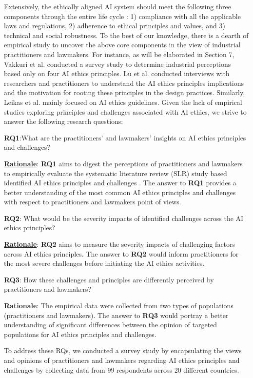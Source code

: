 Extensively, the ethically aligned AI system should meet the following three components through the entire life cycle \cite{AR2}: 1) compliance with all the applicable laws and regulations, 2) adherence to ethical principles and values, and 3) technical and social robustness.
To the best of our knowledge, there is a dearth of empirical study to uncover the above core components in the view of industrial practitioners and lawmakers. For instance, as will be elaborated in Section 7, Vakkuri et al. \cite{AR4} conducted a survey study to determine industrial perceptions based only on four AI ethics principles. Lu et al.\cite{AR12} conducted interviews with researchers and practitioners to understand the AI ethics principles implications and the motivation for rooting these principles in the design practices. Similarly, Leikas et al. \cite{AR5} mainly focused on AI ethics guidelines. Given the lack of empirical studies exploring principles and challenges associated with AI ethics, we strive to answer the following research questions:

\begin{tcolorbox} [sharp corners, boxrule=0.1mm,]
\small
\textbf{RQ1}:What are the practitioners' and lawmakers' insights on AI ethics principles and challenges?
\end{tcolorbox}

\textbf{\underline{Rationale}}: \textbf{RQ1} aims to digest the perceptions of practitioners and lawmakers to empirically evaluate the systematic literature review (SLR) study based identified AI ethics principles and challenges \cite{AR13}. The answer to \textbf{RQ1} provides a better understanding of the most common AI ethics principles and challenges with respect to practitioners and lawmakers point of views.

\begin{tcolorbox} [sharp corners, boxrule=0.1mm,]
\small
\textbf{RQ2}: What would be the severity impacts of identified challenges across the AI ethics principles?
\end{tcolorbox}

\textbf{\underline{Rationale}}: \textbf{RQ2} aims to measure the severity impacts of challenging factors across AI ethics principles. The answer to \textbf{RQ2} would inform practitioners for the most severe challenges before initiating the AI ethics activities.

\begin{tcolorbox} [sharp corners, boxrule=0.1mm,]
\small
\textbf{RQ3}: How these challenges and principles are differently perceived by practitioners and lawmakers?

\end{tcolorbox}

\textbf{\underline{Rationale}}: The empirical data were collected from two types of populations (practitioners and lawmakers). The answer to \textbf{RQ3} would portray a better understanding of significant differences between the opinion of targeted populations for AI ethics principles and challenges.

To address these RQs, we conducted a survey study by encapsulating the views and opinions of practitioners and lawmakers regarding AI ethics principles and challenges by collecting data from 99 respondents across 20 different countries.
